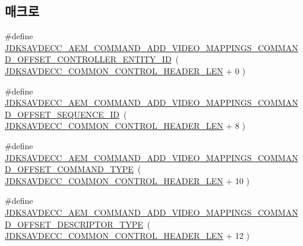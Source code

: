 \subsection*{매크로}
\begin{DoxyCompactItemize}
\item 
\#define \hyperlink{group__command__add__video__mappings_ga599d74c299e0022891b6aa9e239134ca}{J\+D\+K\+S\+A\+V\+D\+E\+C\+C\+\_\+\+A\+E\+M\+\_\+\+C\+O\+M\+M\+A\+N\+D\+\_\+\+A\+D\+D\+\_\+\+V\+I\+D\+E\+O\+\_\+\+M\+A\+P\+P\+I\+N\+G\+S\+\_\+\+C\+O\+M\+M\+A\+N\+D\+\_\+\+O\+F\+F\+S\+E\+T\+\_\+\+C\+O\+N\+T\+R\+O\+L\+L\+E\+R\+\_\+\+E\+N\+T\+I\+T\+Y\+\_\+\+ID}~( \hyperlink{group__jdksavdecc__avtp__common__control__header_gaae84052886fb1bb42f3bc5f85b741dff}{J\+D\+K\+S\+A\+V\+D\+E\+C\+C\+\_\+\+C\+O\+M\+M\+O\+N\+\_\+\+C\+O\+N\+T\+R\+O\+L\+\_\+\+H\+E\+A\+D\+E\+R\+\_\+\+L\+EN} + 0 )
\item 
\#define \hyperlink{group__command__add__video__mappings_gad309055b07c37e92153afa8f451d256f}{J\+D\+K\+S\+A\+V\+D\+E\+C\+C\+\_\+\+A\+E\+M\+\_\+\+C\+O\+M\+M\+A\+N\+D\+\_\+\+A\+D\+D\+\_\+\+V\+I\+D\+E\+O\+\_\+\+M\+A\+P\+P\+I\+N\+G\+S\+\_\+\+C\+O\+M\+M\+A\+N\+D\+\_\+\+O\+F\+F\+S\+E\+T\+\_\+\+S\+E\+Q\+U\+E\+N\+C\+E\+\_\+\+ID}~( \hyperlink{group__jdksavdecc__avtp__common__control__header_gaae84052886fb1bb42f3bc5f85b741dff}{J\+D\+K\+S\+A\+V\+D\+E\+C\+C\+\_\+\+C\+O\+M\+M\+O\+N\+\_\+\+C\+O\+N\+T\+R\+O\+L\+\_\+\+H\+E\+A\+D\+E\+R\+\_\+\+L\+EN} + 8 )
\item 
\#define \hyperlink{group__command__add__video__mappings_ga2b2b04d60a8e432f00f01a93513fd05c}{J\+D\+K\+S\+A\+V\+D\+E\+C\+C\+\_\+\+A\+E\+M\+\_\+\+C\+O\+M\+M\+A\+N\+D\+\_\+\+A\+D\+D\+\_\+\+V\+I\+D\+E\+O\+\_\+\+M\+A\+P\+P\+I\+N\+G\+S\+\_\+\+C\+O\+M\+M\+A\+N\+D\+\_\+\+O\+F\+F\+S\+E\+T\+\_\+\+C\+O\+M\+M\+A\+N\+D\+\_\+\+T\+Y\+PE}~( \hyperlink{group__jdksavdecc__avtp__common__control__header_gaae84052886fb1bb42f3bc5f85b741dff}{J\+D\+K\+S\+A\+V\+D\+E\+C\+C\+\_\+\+C\+O\+M\+M\+O\+N\+\_\+\+C\+O\+N\+T\+R\+O\+L\+\_\+\+H\+E\+A\+D\+E\+R\+\_\+\+L\+EN} + 10 )
\item 
\#define \hyperlink{group__command__add__video__mappings_ga3127188c563e5d2b980716cb79540903}{J\+D\+K\+S\+A\+V\+D\+E\+C\+C\+\_\+\+A\+E\+M\+\_\+\+C\+O\+M\+M\+A\+N\+D\+\_\+\+A\+D\+D\+\_\+\+V\+I\+D\+E\+O\+\_\+\+M\+A\+P\+P\+I\+N\+G\+S\+\_\+\+C\+O\+M\+M\+A\+N\+D\+\_\+\+O\+F\+F\+S\+E\+T\+\_\+\+D\+E\+S\+C\+R\+I\+P\+T\+O\+R\+\_\+\+T\+Y\+PE}~( \hyperlink{group__jdksavdecc__avtp__common__control__header_gaae84052886fb1bb42f3bc5f85b741dff}{J\+D\+K\+S\+A\+V\+D\+E\+C\+C\+\_\+\+C\+O\+M\+M\+O\+N\+\_\+\+C\+O\+N\+T\+R\+O\+L\+\_\+\+H\+E\+A\+D\+E\+R\+\_\+\+L\+EN} + 12 )

\end{DoxyCompactItemize}

